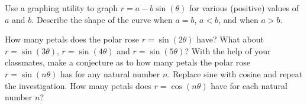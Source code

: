 \documentclass{ximera}
\begin{document}
\begin{problem}
Use a graphing utility to graph  $r = a - b \sin(\theta)$ for various (positive) values of $a$ and $b$.  Describe the shape of the curve when $a = b$, $a < b$, and when $a > b$.
\end{problem}

 \begin{problem}
 How many petals does the polar rose $r = \sin(2\theta)$ have?  What about $r = \sin(3\theta)$, $r = \sin(4\theta)$ and $r = \sin(5\theta)$?  With the help of your classmates, make a conjecture as to how many petals the polar rose $r = \sin(n\theta)$ has for any natural number $n$.  Replace sine with cosine and repeat the investigation.  How many petals does $r = \cos(n\theta)$ have for each natural number $n$?  
\end{problem}
\end{document}

